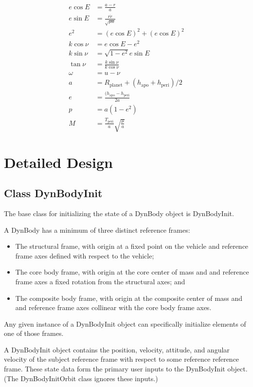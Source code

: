 \begin{align}
  e \cos E &= \frac {a-r}{a} \\
  e \sin E &= \frac{r\dot r}{\sqrt{\mu a}} \\
  e^2 &= (e\cos E)^2 + (e\cos E)^2 \\
  k \cos \nu &= e \cos E - e^2 \\
  k \sin \nu &= \sqrt{1-e^2} e \sin E \\
  \tan \nu &= \frac{k \sin \nu}{k \cos \nu} \\
  \omega &= u - \nu \\
  a &= R_{\text{planet}} + (h_{\text{apo}} + h_{\text{peri}})/2 \\
  e &= \frac {(h_{\text{apo}} - h_{\text{peri}}}{2a} \\
  p &= a(1-e^2) \\
  M &= \frac{T_{\text{peri}}}{a} \sqrt{\frac {\mu}{a}}
\end{align}

\section{Detailed Design}

\subsection{Class DynBodyInit}
The base class for initializing the state of a DynBody object is DynBodyInit.

A DynBody has a minimum of three distinct reference frames:
\begin{itemize}
\item The structural frame, with origin at a fixed point on the vehicle
and reference frame axes defined with respect to the vehicle;
\item The core body frame, with origin at the core center of mass and
and reference frame axes a fixed rotation from the structural axes; and
\item The composite body frame, with origin at the composite center of mass and
and reference frame axes collinear with the core body frame axes.
\end{itemize}
Any given instance of a DynBodyInit object can specifically initialize elements
of one of those frames.

A DynBodyInit object contains the position, velocity, attitude, and
angular velocity of the subject reference frame with respect to some reference
reference frame. These state data form the primary user inputs to the
DynBodyInit object. (The DynBodyInitOrbit class ignores these inputs.)

